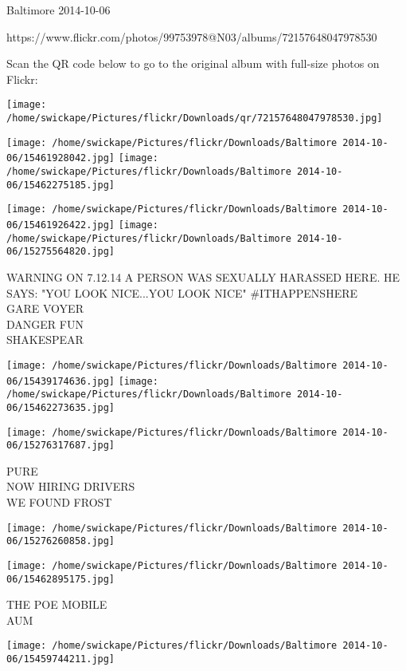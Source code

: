 \documentclass[10pt,letterpaper]{article}
\begin{document}
Baltimore 2014-10-06

https://www.flickr.com/photos/99753978@N03/albums/72157648047978530

Scan the QR code below to go to the original album with full-size photos on Flickr:

\texttt{[image: /home/swickape/Pictures/flickr/Downloads/qr/72157648047978530.jpg]}
\pagebreak

\texttt{[image: /home/swickape/Pictures/flickr/Downloads/Baltimore 2014-10-06/15461928042.jpg]}
\texttt{[image: /home/swickape/Pictures/flickr/Downloads/Baltimore 2014-10-06/15462275185.jpg]}

\texttt{[image: /home/swickape/Pictures/flickr/Downloads/Baltimore 2014-10-06/15461926422.jpg]}
\texttt{[image: /home/swickape/Pictures/flickr/Downloads/Baltimore 2014-10-06/15275564820.jpg]}

WARNING ON 7.12.14 A PERSON WAS SEXUALLY HARASSED HERE.  HE SAYS: "YOU LOOK NICE...YOU LOOK NICE" \#ITHAPPENSHERE\\
GARE VOYER\\
DANGER FUN\\
SHAKESPEAR\\
\pagebreak

\texttt{[image: /home/swickape/Pictures/flickr/Downloads/Baltimore 2014-10-06/15439174636.jpg]}
\texttt{[image: /home/swickape/Pictures/flickr/Downloads/Baltimore 2014-10-06/15462273635.jpg]}

\texttt{[image: /home/swickape/Pictures/flickr/Downloads/Baltimore 2014-10-06/15276317687.jpg]}

PURE\\
NOW HIRING DRIVERS\\
WE FOUND FROST\\
\pagebreak

\texttt{[image: /home/swickape/Pictures/flickr/Downloads/Baltimore 2014-10-06/15276260858.jpg]}

\vspace{0.25in}
\texttt{[image: /home/swickape/Pictures/flickr/Downloads/Baltimore 2014-10-06/15462895175.jpg]}

THE POE MOBILE\\
AUM\\
\pagebreak

\texttt{[image: /home/swickape/Pictures/flickr/Downloads/Baltimore 2014-10-06/15459744211.jpg]}
\end{document}
